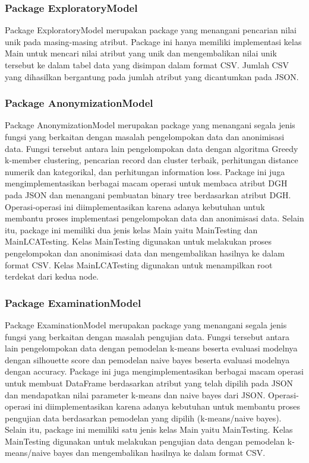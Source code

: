 \subsubsection{Package ExploratoryModel}
Package ExploratoryModel merupakan package yang menangani pencarian nilai unik pada masing-masing atribut. Package ini hanya memiliki implementasi kelas Main untuk mencari nilai atribut yang unik dan mengembalikan nilai unik tersebut ke dalam tabel data yang disimpan dalam format CSV. Jumlah CSV yang dihasilkan bergantung pada jumlah atribut yang dicantumkan pada JSON.

\subsubsection{Package AnonymizationModel}
Package AnonymizationModel merupakan package yang menangani segala jenis fungsi yang berkaitan dengan masalah pengelompokan data dan anonimisasi data. Fungsi tersebut antara lain pengelompokan data dengan algoritma Greedy k-member clustering, pencarian record dan cluster terbaik, perhitungan distance numerik dan kategorikal, dan perhitungan information loss. Package ini juga mengimplementasikan berbagai macam operasi untuk membaca atribut DGH pada JSON dan menangani pembuatan binary tree berdasarkan atribut DGH. Operasi-operasi ini diimplementasikan karena adanya kebutuhan untuk membantu proses implementasi pengelompokan data dan anonimisasi data. Selain itu, package ini memiliki dua jenis kelas Main yaitu MainTesting dan MainLCATesting. Kelas MainTesting digunakan untuk melakukan proses pengelompokan dan anonimisasi data dan mengembalikan hasilnya ke dalam format CSV. Kelas MainLCATesting digunakan untuk menampilkan root terdekat dari kedua node. 

\subsubsection{Package ExaminationModel}
Package ExaminationModel merupakan package yang menangani segala jenis fungsi yang berkaitan dengan masalah pengujian data. Fungsi tersebut antara lain pengelompokan data dengan pemodelan k-means beserta evaluasi modelnya dengan silhouette score dan pemodelan naive bayes beserta evaluasi modelnya dengan accuracy. Package ini juga mengimplementasikan berbagai macam operasi untuk membuat DataFrame berdasarkan atribut yang telah dipilih pada JSON dan mendapatkan nilai parameter k-means dan naive bayes dari JSON. Operasi-operasi ini diimplementasikan karena adanya kebutuhan untuk membantu proses pengujian data berdasarkan pemodelan yang dipilih (k-means/naive bayes). Selain itu, package ini memiliki satu jenis kelas Main yaitu MainTesting. Kelas MainTesting digunakan untuk melakukan pengujian data dengan pemodelan k-means/naive bayes dan mengembalikan hasilnya ke dalam format CSV.


